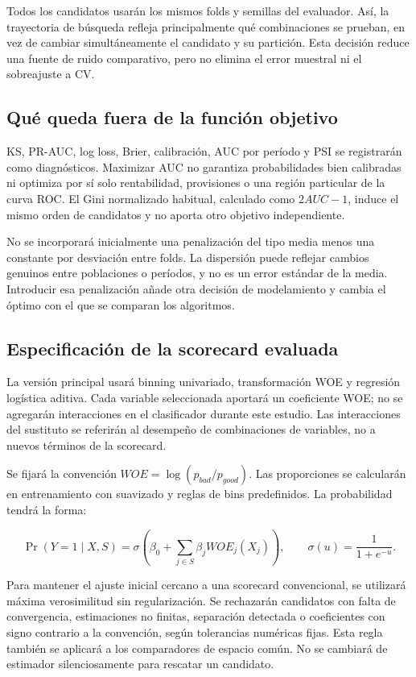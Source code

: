 \documentclass[11pt,letterpaper]{article}
\begin{document}
Todos los candidatos usarán los mismos folds y semillas del evaluador. Así, la trayectoria de búsqueda refleja principalmente qué combinaciones se prueban, en vez de cambiar simultáneamente el candidato y su partición. Esta decisión reduce una fuente de ruido comparativo, pero no elimina el error muestral ni el sobreajuste a CV.

\subsection{Qué queda fuera de la función objetivo}\label{sec:4.2}

KS, PR-AUC, log loss, Brier, calibración, AUC por período y PSI se registrarán como diagnósticos. Maximizar AUC no garantiza probabilidades bien calibradas ni optimiza por sí solo rentabilidad, provisiones o una región particular de la curva ROC. El Gini normalizado habitual, calculado como \(2AUC-1\), induce el mismo orden de candidatos y no aporta otro objetivo independiente.

No se incorporará inicialmente una penalización del tipo media menos una constante por desviación entre folds. La dispersión puede reflejar cambios genuinos entre poblaciones o períodos, y no es un error estándar de la media. Introducir esa penalización añade otra decisión de modelamiento y cambia el óptimo con el que se comparan los algoritmos.

\subsection{Especificación de la scorecard evaluada}\label{sec:4.3}

La versión principal usará binning univariado, transformación WOE y regresión logística aditiva. Cada variable seleccionada aportará un coeficiente WOE; no se agregarán interacciones en el clasificador durante este estudio. Las interacciones del sustituto se referirán al desempeño de combinaciones de variables, no a nuevos términos de la scorecard.

Se fijará la convención \(WOE=\log(p_{bad}/p_{good})\). Las proporciones se calcularán en entrenamiento con suavizado y reglas de bins predefinidos. La probabilidad tendrá la forma:

\[
\Pr(Y=1\mid X,S)=\sigma\left(\beta_0+\sum_{j\in S}\beta_jWOE_j(X_j)\right),
\qquad \sigma(u)=\frac{1}{1+e^{-u}}.
\]

Para mantener el ajuste inicial cercano a una scorecard convencional, se utilizará máxima verosimilitud sin regularización. Se rechazarán candidatos con falta de convergencia, estimaciones no finitas, separación detectada o coeficientes con signo contrario a la convención, según tolerancias numéricas fijas. Esta regla también se aplicará a los comparadores de espacio común. No se cambiará de estimador silenciosamente para rescatar un candidato.
\end{document}
